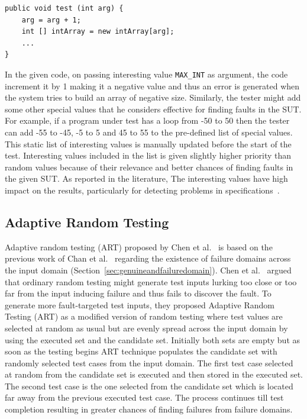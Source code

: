 \begin{lstlisting}
public void test (int arg) {
	arg = arg + 1;
	int [] intArray = new intArray[arg];
	...
}
\end{lstlisting}

In the given code, on passing interesting value \verb+MAX_INT+ as argument, the code increment it by 1 making it a negative value and thus an error is generated when the system tries to build an array of negative size. Similarly, the tester might add some other special values that he considers effective for finding faults in the SUT. For example, if a program under test has a loop from -50 to 50 then the tester can add -55 to -45, -5 to 5 and 45 to 55 to the pre-defined list of special values. This static list of interesting values is manually updated before the start of the test. Interesting values included in the list is given slightly higher priority than random values because of their relevance and better chances of finding faults in the given SUT. As reported in the literature, The interesting values have high impact on the results, particularly for detecting problems in specifications~\cite{ciupa2008finding}.


\subsection{Adaptive Random Testing}
\label{sec:artpatterns_2}
Adaptive random testing (ART) proposed by Chen et al.~\cite{chen2005adaptive} is based on the previous work of Chan et al.~\cite{chan1996proportional} regarding the existence of failure domains across the input domain (Section~\ref{sec:genuineandfailuredomain}). Chen et al.~\cite{chen2005adaptive} argued that ordinary random testing might generate test inputs lurking too close or too far from the input inducing failure and thus fails to discover the fault. To generate more fault-targeted test inputs, they proposed Adaptive Random Testing (ART) as a modified version of random testing where test values are selected at random as usual but are evenly spread across the input domain by using the executed set and the candidate set. Initially both sets are empty but as soon as the testing begins ART technique populates the candidate set with randomly selected test cases from the input domain. The first test case selected at random from the candidate set is executed and then stored in the executed set. The second test case is the one selected from the candidate set which is located far away from the previous executed test case. The process continues till test completion resulting in greater chances of finding failures from failure domains.

